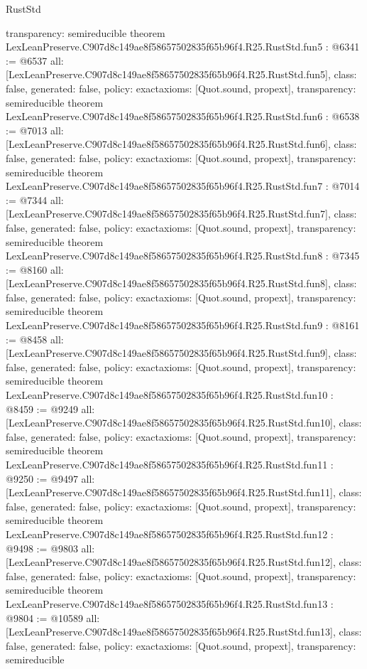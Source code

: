 \begin{lexlean}{RustStd}
\begin{coremodule}
{  transparency: semireducible
}
theorem LexLeanPreserve.C907d8c149ae8f58657502835f65b96f4.R25.RustStd.fun5 : @6341 := @6537 {
  all: [LexLeanPreserve.C907d8c149ae8f58657502835f65b96f4.R25.RustStd.fun5],
  class: false,
  generated: false,
  policy: exact{axioms: [Quot.sound, propext]},
  transparency: semireducible
}
theorem LexLeanPreserve.C907d8c149ae8f58657502835f65b96f4.R25.RustStd.fun6 : @6538 := @7013 {
  all: [LexLeanPreserve.C907d8c149ae8f58657502835f65b96f4.R25.RustStd.fun6],
  class: false,
  generated: false,
  policy: exact{axioms: [Quot.sound, propext]},
  transparency: semireducible
}
theorem LexLeanPreserve.C907d8c149ae8f58657502835f65b96f4.R25.RustStd.fun7 : @7014 := @7344 {
  all: [LexLeanPreserve.C907d8c149ae8f58657502835f65b96f4.R25.RustStd.fun7],
  class: false,
  generated: false,
  policy: exact{axioms: [Quot.sound, propext]},
  transparency: semireducible
}
theorem LexLeanPreserve.C907d8c149ae8f58657502835f65b96f4.R25.RustStd.fun8 : @7345 := @8160 {
  all: [LexLeanPreserve.C907d8c149ae8f58657502835f65b96f4.R25.RustStd.fun8],
  class: false,
  generated: false,
  policy: exact{axioms: [Quot.sound, propext]},
  transparency: semireducible
}
theorem LexLeanPreserve.C907d8c149ae8f58657502835f65b96f4.R25.RustStd.fun9 : @8161 := @8458 {
  all: [LexLeanPreserve.C907d8c149ae8f58657502835f65b96f4.R25.RustStd.fun9],
  class: false,
  generated: false,
  policy: exact{axioms: [Quot.sound, propext]},
  transparency: semireducible
}
theorem LexLeanPreserve.C907d8c149ae8f58657502835f65b96f4.R25.RustStd.fun10 : @8459 := @9249 {
  all: [LexLeanPreserve.C907d8c149ae8f58657502835f65b96f4.R25.RustStd.fun10],
  class: false,
  generated: false,
  policy: exact{axioms: [Quot.sound, propext]},
  transparency: semireducible
}
theorem LexLeanPreserve.C907d8c149ae8f58657502835f65b96f4.R25.RustStd.fun11 : @9250 := @9497 {
  all: [LexLeanPreserve.C907d8c149ae8f58657502835f65b96f4.R25.RustStd.fun11],
  class: false,
  generated: false,
  policy: exact{axioms: [Quot.sound, propext]},
  transparency: semireducible
}
theorem LexLeanPreserve.C907d8c149ae8f58657502835f65b96f4.R25.RustStd.fun12 : @9498 := @9803 {
  all: [LexLeanPreserve.C907d8c149ae8f58657502835f65b96f4.R25.RustStd.fun12],
  class: false,
  generated: false,
  policy: exact{axioms: [Quot.sound, propext]},
  transparency: semireducible
}
theorem LexLeanPreserve.C907d8c149ae8f58657502835f65b96f4.R25.RustStd.fun13 : @9804 := @10589 {
  all: [LexLeanPreserve.C907d8c149ae8f58657502835f65b96f4.R25.RustStd.fun13],
  class: false,
  generated: false,
  policy: exact{axioms: [Quot.sound, propext]},
  transparency: semireducible
}
\end{coremodule}
\end{lexlean}
